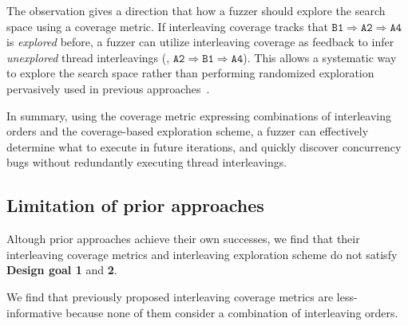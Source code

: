 %
The observation gives a direction that how a fuzzer should explore 
the search space using a coverage metric.
If interleaving coverage tracks that
$\texttt{B1} \Rightarrow \texttt{A2} \Rightarrow \texttt{A4}$ is
\textit{explored} before, a fuzzer can utilize interleaving
coverage as feedback to infer \textit{unexplored} thread interleavings (\eg,
$\texttt{A2} \Rightarrow \texttt{B1} \Rightarrow \texttt{A4}$).
%
This allows a systematic way to explore the search space rather than
performing randomized exploration pervasively used in previous
approaches~\cite{ski, krace, pctalgorithm, muzz}.
%

In summary, using the coverage metric expressing combinations of
interleaving orders and the coverage-based exploration scheme, a
fuzzer can effectively determine what to execute in future iterations,
and quickly discover concurrency bugs without redundantly executing
thread interleavings.

\subsection{Limitation of prior approaches}
\label{ss:existingapproaches}
%
%   

%
Altough prior approaches achieve their own successes, we find that
their interleaving coverage metrics and interleaving exploration
scheme do not satisfy \textbf{Design goal 1} and \textbf{2}.


%
We find that previously proposed interleaving coverage metrics are
less-informative because none of them consider a combination of
interleaving orders.


